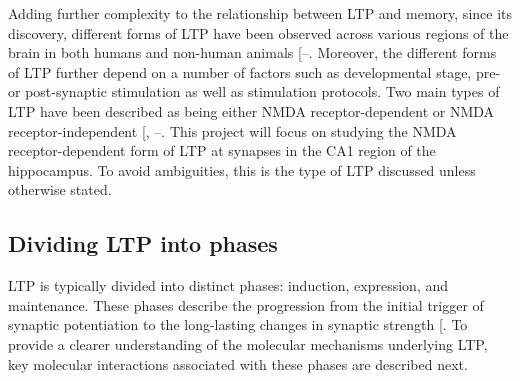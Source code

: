 \documentclass[
  11pt,
  letterpaper,
]{scrreprt}
\begin{document}
Adding further complexity to the relationship between LTP and memory,
since its discovery, different forms of LTP have been observed across
various regions of the brain in both humans and non-human animals
{[}--\citeproc{ref-spriggs2019Human}{58}{]}.
Moreover, the different forms of LTP further depend on a number of
factors such as developmental stage, pre- or post-synaptic stimulation
as well as stimulation protocols. Two main types of LTP have been
described as being either NMDA receptor-dependent or NMDA
receptor-independent {[},
--\citeproc{ref-kumar2011LongTerm}{72}{]}.
This project will focus on studying the NMDA receptor-dependent form of
LTP at synapses in the CA1 region of the hippocampus. To avoid
ambiguities, this is the type of LTP discussed unless otherwise stated.

\subsection{Dividing LTP into phases}\label{sec-LTP-phases}

LTP is typically divided into distinct phases: induction, expression,
and maintenance. These phases describe the progression from the initial
trigger of synaptic potentiation to the long-lasting changes in synaptic
strength {[}\citeproc{ref-sweatt2010Chaptera}{73}{]}. To provide a
clearer understanding of the molecular mechanisms underlying LTP, key
molecular interactions associated with these phases are described next.
\end{document}
